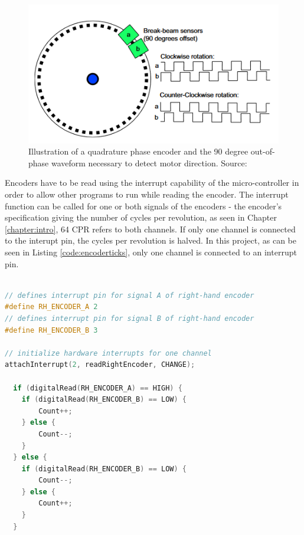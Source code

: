 \begin{figure}[H]
\includegraphics[scale=0.75]{Figures/encoder.PNG}
\centering
\caption{Illustration of a quadrature phase encoder and the 90 degree out-of-phase waveform necessary to detect motor direction. Source: \cite{mit}}
\label{figure:encoder}
\end{figure}

Encoders have to be read using the interrupt capability of the micro-controller in order to allow other programs to run while reading the encoder. The interrupt function can be called for one or both signals of the encoders - the encoder's specification giving the number of cycles per revolution, as seen in Chapter \ref{chapter:intro}, 64 CPR refers to both channels. If only one channel is connected to the interupt pin, the cycles per revolution is halved. In this project, as can be seen in Listing \ref{code:encoderticks}, only one channel is connected to an interrupt pin.\\
  
\begin{lstlisting}[language=C++, caption={Encoder ticks count for determining motor spin direction. If the count is increasing, then the motor is driving forward and vice-versa.}, label={code:encoderticks}]

// defines interrupt pin for signal A of right-hand encoder
#define RH_ENCODER_A 2
// defines interrupt pin for signal B of right-hand encoder
#define RH_ENCODER_B 3

// initialize hardware interrupts for one channel
attachInterrupt(2, readRightEncoder, CHANGE);

  if (digitalRead(RH_ENCODER_A) == HIGH) {
    if (digitalRead(RH_ENCODER_B) == LOW) {
        Count++;
    } else {
        Count--;
    }
  } else {
    if (digitalRead(RH_ENCODER_B) == LOW) {
        Count--;
    } else {
        Count++;
    }
  }

\end{lstlisting}
  
